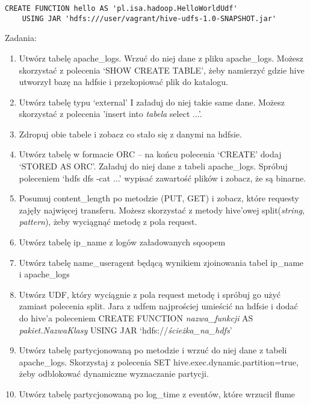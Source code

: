 \documentclass[11pt]{article}
\begin{document}
\begin{lstlisting}
CREATE FUNCTION hello AS 'pl.isa.hadoop.HelloWorldUdf'
	USING JAR 'hdfs:///user/vagrant/hive-udfs-1.0-SNAPSHOT.jar'
\end{lstlisting}

\pagebreak

Zadania:
\begin{enumerate}
\item Utwórz tabelę apache\_logs. Wrzuć do niej dane z pliku apache\_logs. Możesz skorzystać z polecenia ‘SHOW CREATE TABLE’, żeby namierzyć gdzie hive utworzył bazę na hdfsie i przekopiować plik do katalogu.
\item Utwórz tabelę typu ‘external’ I załaduj do niej takie same dane. Możesz skorzystać z polecenia 'insert into \textit{tabela} select ...'.
\item Zdropuj obie tabele i zobacz co stało się z danymi na hdfsie.
\item Utwórz tabelę w formacie ORC – na końcu polecenia ‘CREATE’ dodaj ‘STORED AS ORC’. Załaduj do niej dane z tabeli apache\_logs. Spróbuj poleceniem ‘hdfs dfs -cat ...’ wypisać zawartość plików i zobacz, że są binarne.
\item Posumuj content\_length po metodzie (PUT, GET) i zobacz, które requesty zajęły najwięcej transferu. Możesz skorzystać z metody hive’owej split(\textit{string}, \textit{pattern}), żeby wyciągnąć metodę z pola request.
\item Utwórz tabelę ip\_name z logów załadowanych sqoopem
\item Utwórz tabelę name\_useragent będącą wynikiem zjoinowania tabel ip\_name i apache\_logs
\item Utwórz UDF, który wyciągnie z pola request metodę i spróbuj go użyć zamiast polecenia split. Jara z udfem najprościej umieścić na hdfsie i dodać do hive’a poleceniem CREATE FUNCTION \textit{nazwa\_funkcji} AS \textit{pakiet.NazwaKlasy} USING JAR ‘hdfs://\textit{ścieżka\_na\_hdfs}’
\item Utwórz tabelę partycjonowaną po metodzie i wrzuć do niej dane z tabeli apache\_logs. Skorzystaj z polecenia SET hive.exec.dynamic.partition=true, żeby odblokować dynamiczne wyznaczanie partycji.
\item Utwórz tabelę partycjonowaną po log_time z eventów, które wrzucił flume
\end{enumerate}
\end{document}
